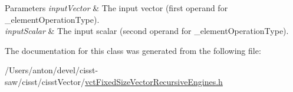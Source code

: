 \begin{DoxyParams}{Parameters}
{\em input\+Vector} & The input vector (first operand for \+\_\+element\+Operation\+Type).\\
\hline
{\em input\+Scalar} & The input scalar (second operand for \+\_\+element\+Operation\+Type). \\
\hline
\end{DoxyParams}


The documentation for this class was generated from the following file\+:\begin{DoxyCompactItemize}
\item 
/\+Users/anton/devel/cisst-\/saw/cisst/cisst\+Vector/\hyperlink{vct_fixed_size_vector_recursive_engines_8h}{vct\+Fixed\+Size\+Vector\+Recursive\+Engines.\+h}\end{DoxyCompactItemize}
